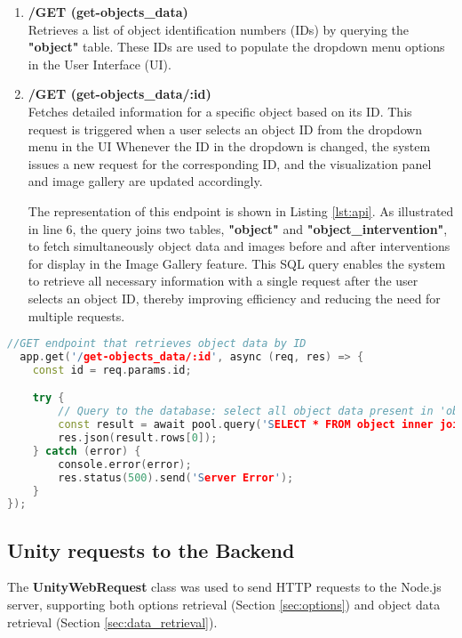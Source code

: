 \begin{enumerate}
  \item \textbf{/GET (get-objects\_data)}
  \\Retrieves a list of object identification numbers (\glspl{ID}) by querying the \textbf{"object"} table. These \glspl{ID} are used to populate the dropdown menu options in the User Interface (\gls{UI}).

  \item \textbf{/GET (get-objects\_data/:id)}
  \\Fetches detailed information for a specific object based on its \gls{ID}. This request is triggered when a user selects an object \gls{ID} from the dropdown menu in the \gls{UI}
  Whenever the \gls{ID} in the dropdown is changed, the system issues a new request for the corresponding \gls{ID}, and the visualization panel and image gallery are updated accordingly.

    The representation of this endpoint is shown in Listing \ref{lst:api}. As illustrated in line 6, the query joins two tables, \textbf{"object"} and \textbf{"object\_intervention"}, to fetch simultaneously object data and images before and after interventions for display in the Image Gallery feature. 
    This SQL query enables the system to retrieve all necessary information with a single request after the user selects an object \gls{ID}, thereby improving efficiency and reducing the need for multiple requests.

\end{enumerate}

\begin{lstlisting}[language=C++, caption={Example of defining an \gls{API} endpoint in Node.js.},label={lst:api},float]
  //GET endpoint that retrieves object data by ID
  app.get('/get-objects_data/:id', async (req, res) => {
    const id = req.params.id;

    try {
        // Query to the database: select all object data present in 'object' and 'object_intervention' tables         
        const result = await pool.query('SELECT * FROM object inner join object_intervention on object.id = object_intervention.object_id WHERE object.id = $1', [id]);
        res.json(result.rows[0]);
    } catch (error) {
        console.error(error);
        res.status(500).send('Server Error');
    }
});
\end{lstlisting}

\subsection{Unity requests to the Backend}
The \textbf{UnityWebRequest} class was used to send HTTP requests to the Node.js server, supporting both options retrieval (Section \ref{sec:options}) and object data retrieval (Section \ref{sec:data_retrieval}).

